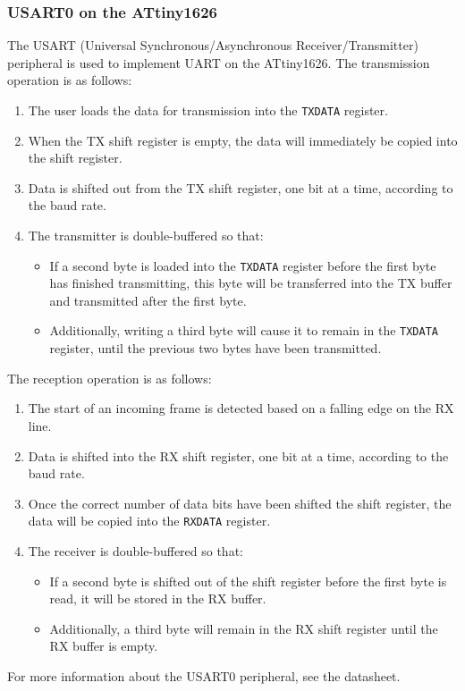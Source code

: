 \documentclass{report}
\begin{document}
\subsubsection{USART0 on the ATtiny1626}
The USART (Universal Synchronous/Asynchronous Receiver/Transmitter)
peripheral is used to implement UART on the ATtiny1626.
The transmission operation is as follows:
\begin{enumerate}
    \item The user loads the data for transmission into the \texttt{TXDATA} register.
    \item When the TX shift register is empty, the data will immediately be copied into the shift register.
    \item Data is shifted out from the TX shift register, one bit at a time, according to the baud rate.
    \item The transmitter is double-buffered so that:
          \begin{itemize}
              \item If a second byte is loaded into the \texttt{TXDATA} register before the first byte has finished transmitting,
                    this byte will be transferred into the TX buffer and transmitted after the first byte.
              \item Additionally, writing a third byte will cause it to remain in the \texttt{TXDATA} register, until the previous two bytes have been transmitted.
          \end{itemize}
\end{enumerate}
The reception operation is as follows:
\begin{enumerate}
    \item The start of an incoming frame is detected based on a falling edge on the RX line.
    \item Data is shifted into the RX shift register, one bit at a time, according to the baud rate.
    \item Once the correct number of data bits have been shifted the shift register, the data will be copied into the
          \texttt{RXDATA} register.
    \item The receiver is double-buffered so that:
          \begin{itemize}
              \item If a second byte is shifted out of the shift register before the first byte is read, it will be stored in the RX buffer.
              \item Additionally, a third byte will remain in the RX shift register until the RX buffer is empty.
          \end{itemize}
\end{enumerate}
For more information about the USART0 peripheral, see the datasheet.
\end{document}
